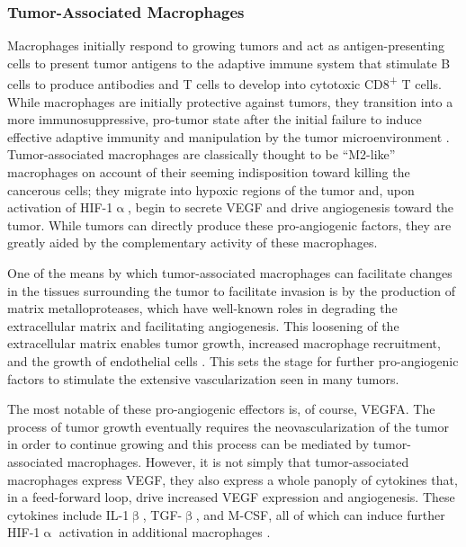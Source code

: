 \subsubsection{Tumor\hyp{}Associated Macrophages}\label{tams}

Macrophages initially respond to growing tumors and act as antigen\hyp{}presenting cells to present tumor antigens to the adaptive immune system that stimulate B cells to produce antibodies and T cells to develop into cytotoxic CD8\textsuperscript{+} T cells. While macrophages are initially protective against tumors, they transition into a more immunosuppressive, pro\hyp{}tumor state after the initial failure to induce effective adaptive immunity and manipulation by the tumor microenvironment \citep{Noy2014}. Tumor\hyp{}associated macrophages are classically thought to be ``M2\hyp{}like'' macrophages on account of their seeming indisposition toward killing the cancerous cells; they migrate into hypoxic regions of the tumor and, upon activation of HIF\hyp{}1$\upalpha$, begin to secrete VEGF and drive angiogenesis toward the tumor. While tumors can directly produce these pro\hyp{}angiogenic factors, they are greatly aided by the complementary activity of these macrophages.

One of the means by which tumor\hyp{}associated macrophages can facilitate changes in the tissues surrounding the tumor to facilitate invasion is by the production of matrix metalloproteases, which have well\hyp{}known roles in degrading the extracellular matrix and facilitating angiogenesis. This loosening of the extracellular matrix enables tumor growth, increased macrophage recruitment, and the growth of endothelial cells \citep{Lamagna2006}. This sets the stage for further pro\hyp{}angiogenic factors to stimulate the extensive vascularization seen in many tumors.

The most notable of these pro\hyp{}angiogenic effectors is, of course, VEGFA. The process of tumor growth eventually requires the neovascularization of the tumor in order to continue growing and this process can be mediated by tumor\hyp{}associated macrophages. However, it is not simply that tumor\hyp{}associated macrophages express VEGF, they also express a whole panoply of cytokines that, in a feed\hyp{}forward loop, drive increased VEGF expression and angiogenesis. These cytokines include IL\hyp{}1$\upbeta$, TGF\hyp{}$\upbeta$, and M\hyp{}CSF, all of which can induce further HIF\hyp{}1$\upalpha$ activation in additional macrophages \citep{Nicholas2010, Guo2016}.

